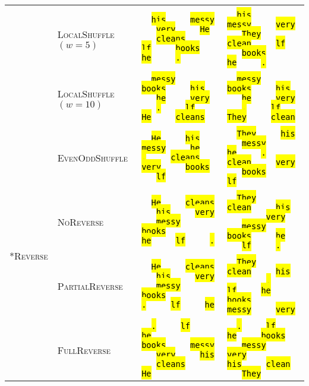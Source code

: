 \documentclass[11pt]{article}
\newcommand{\revmarker}{%
  \setlength{\fboxsep}{1pt}%
  \fbox{\texttt{R}}%
}
\newcommand{\highlight}[2]{%
    \begingroup
    \definecolor{hlcolor}{HTML}{#1}%
    \sethlcolor{hlcolor}%
    \hl{#2}%
    \endgroup
}
\newcommand{\tokenHe}{%
  \highlight{FDFD95}{He}%
}
\newcommand{\tokenThey}{%
  \highlight{FDFD95}{They}%
}
\newcommand{\tokencleans}{%
  \highlight{FDE4CF}{ cleans}%
}
\newcommand{\tokenclean}{%
  \highlight{FDE4CF}{ clean}%
}
\newcommand{\tokenhis}{%
  \highlight{FFCFD2}{ his}%
}
\newcommand{\tokenvery}{%
  \highlight{F1C0E8}{ very}%
}
\newcommand{\tokenmessy}{%
  \highlight{CFBAF0}{ messy}%
}
\newcommand{\tokenbooks}{%
  \highlight{A3C4F3}{ books}%
}
\newcommand{\tokenhe}{%
  \highlight{90DBF4}{he}%
}
\newcommand{\tokenlf}{%
  \highlight{98F5E1}{lf}%
}
\newcommand{\tokenperiod}{%
  \highlight{B9FBC0}{.}%
}
\newcommand{\tokenrev}{%
  \highlight{8DE969}{\revmarker}%
}
\begin{document}
\begin{table*}
{\begin{tabular}{l|l|l|l}
    & & & \\[-1em]
    & \textcolor{locshuf5}{\textsc{LocalShuffle}$(w=5)$}            & \texttt{\tokenhis\,\tokenmessy\,\tokenvery\,\tokenHe\,\tokencleans\,\tokenlf\,\tokenbooks\,\tokenhe\,\tokenperiod} & \texttt{\tokenhis\,\tokenmessy\,\tokenvery\,\tokenThey\,\tokenclean\,\tokenlf\,\tokenbooks\,\tokenhe\,\tokenperiod} \\[3pt] \cline{2-4}
    & & & \\[-1em]
    & \textcolor{locshuf10}{\textsc{LocalShuffle}$(w=10)$}           & \texttt{\tokenmessy\,\tokenbooks\,\tokenhis\,\tokenhe\,\tokenvery\,\tokenperiod\,\tokenlf\,\tokenHe\,\tokencleans} & \texttt{\tokenmessy\,\tokenbooks\,\tokenhis\,\tokenhe\,\tokenvery\,\tokenperiod\,\tokenlf\,\tokenThey\,\tokenclean} \\[3pt] \cline{2-4}
    & & & \\[-1em]
    & \textcolor{evenodd}{\textsc{EvenOddShuffle}}                        & \texttt{\tokenHe\,\tokenhis\,\tokenmessy\,\tokenhe\,\tokenperiod\,\tokencleans\,\tokenvery\,\tokenbooks\,\tokenlf} & \texttt{\tokenThey\,\tokenhis\,\tokenmessy\,\tokenhe\,\tokenperiod\,\tokenclean\,\tokenvery\,\tokenbooks\,\tokenlf} \\[3pt]
    \hline
    & & & \\[-1em]
    \multirow{4}{*}{\textsc{*Reverse}} & \textcolor{controlrev}{\textsc{NoReverse}}              & \texttt{\tokenHe\,\tokencleans\,\tokenhis\,\tokenvery\,\tokenmessy\,\tokenbooks\,\tokenrev\,\tokenhe\,\tokenlf\,\tokenperiod} & \texttt{\tokenThey\,\tokenclean\,\tokenhis\,\tokenrev\,\tokenvery\,\tokenmessy\,\tokenbooks\,\tokenhe\,\tokenlf\,\tokenperiod} \\[3pt] \cline{2-4}
    & & & \\[-1em]
    & \textcolor{partialrev}{\textsc{PartialReverse}}                 & \texttt{\tokenHe\,\tokencleans\,\tokenhis\,\tokenvery\,\tokenmessy\,\tokenbooks\,\tokenrev\,\tokenperiod\,\tokenlf\,\tokenhe} & \texttt{\tokenThey\,\tokenclean\,\tokenhis\,\tokenrev\,\tokenperiod\,\tokenlf\,\tokenhe\,\tokenbooks\,\tokenmessy\,\tokenvery} \\[3pt] \cline{2-4}
    & & & \\[-1em]
    & \textcolor{fullrev}{\textsc{FullReverse}}                        & \texttt{\tokenperiod\,\tokenlf\,\tokenhe\,\tokenrev\,\tokenbooks\,\tokenmessy\,\tokenvery\,\tokenhis\,\tokencleans\,\tokenHe} & \texttt{\tokenperiod\,\tokenlf\,\tokenhe\,\tokenbooks\,\tokenmessy\,\tokenvery\,\tokenrev\,\tokenhis\,\tokenclean\,\tokenThey} \\[3pt] \hline

\end{tabular}}
\end{table*}
\end{document}
